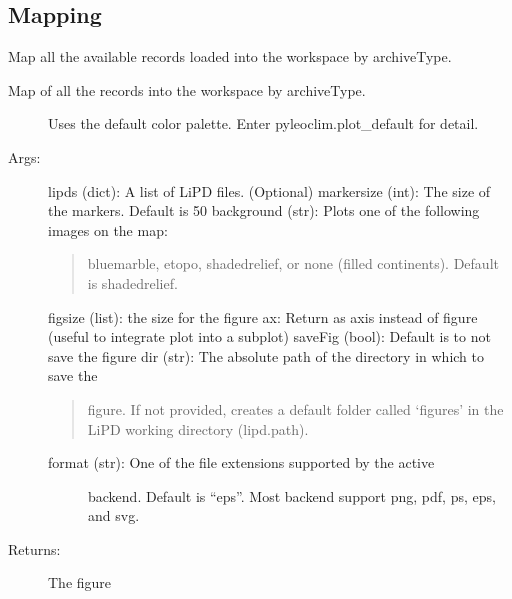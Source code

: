 \documentclass[letterpaper,10pt,english]{sphinxmanual}
\begin{document}
\subsection{Mapping}
\label{\detokenize{Main:mapping}}

\begin{fulllineitems}
\label{\detokenize{Main:pyleoclim.mapAllArchive}}
Map all the available records loaded into the workspace by archiveType.
\begin{description}
\item[{Map of all the records into the workspace by archiveType.}] \leavevmode
Uses the default color palette. Enter pyleoclim.plot\_default for detail.

\item[{Args:}] \leavevmode
lipds (dict): A list of LiPD files. (Optional)
markersize (int): The size of the markers. Default is 50
background (str): Plots one of the following images on the map:
\begin{quote}

bluemarble, etopo, shadedrelief, or none (filled continents).
Default is shadedrelief.
\end{quote}

figsize (list): the size for the figure
ax: Return as axis instead of figure (useful to integrate plot into a subplot)     
saveFig (bool): Default is to not save the figure
dir (str): The absolute path of the directory in which to save the
\begin{quote}

figure. If not provided, creates a default folder called ‘figures’
in the LiPD working directory (lipd.path).
\end{quote}
\begin{description}
\item[{format (str): One of the file extensions supported by the active}] \leavevmode
backend. Default is “eps”. Most backend support png, pdf, ps, eps,
and svg.

\end{description}

\item[{Returns:}] \leavevmode
The figure

\end{description}

\end{fulllineitems}
\end{document}
